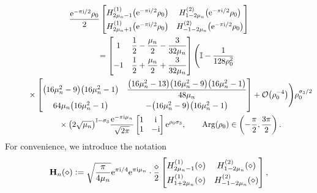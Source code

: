 \documentclass[11pt]{article}
\numberwithin{equation}{section}
\numberwithin{equation}{section}
\newcommand{\ee}{\mathrm{e}}
\newcommand{\ii}{\mathrm{i}}
\renewcommand{\arg}{\operatorname{Arg}}
\begin{document}
\begin{gather}
\dfrac{\ee^{-\pi \ii /2}\rho_0}{2} \begin{bmatrix} H^{(1)}_{2\mu_n-1}\big(\ee^{-\pi \ii/2} \rho_0\big) & H^{(2)}_{1 -2\mu_n}\big(\ee^{-\pi \ii/2} \rho_0\big)\vspace{1mm}\\ H^{(1)}_{2\mu_n + 1}\big(\ee^{-\pi \ii/2} \rho_0\big) & H^{(2)}_{-1-2\mu_n}\big(\ee^{-\pi \ii/2} \rho_0\big)\end{bmatrix} \nonumber\\
\qquad= \begin{bmatrix} 1 & \dfrac{1}{2} - \dfrac{\mu_n}{2} - \dfrac{3}{32\mu_n} \vspace{1mm}\\ -1 & \dfrac{1}{2} + \dfrac{\mu_n}{2} + \dfrac{3}{32\mu_n} \end{bmatrix} \Biggl( \mathbb{I} - \dfrac{1}{128 \rho_0^2}  \nonumber\\
\phantom{\qquad=}{}  \times\begin{bmatrix} \big(16\mu_n^2 - 9\big)\big(16\mu_n^2 - 1\big) & \dfrac{\big(16 \mu_n^2 - 13\big)\big(16\mu_n^2 - 9\big)\big(16\mu_n^2 - 1\big)}{48\mu_n} \vspace{1mm}\\ 64\mu_n\big(16\mu_n^2 - 1\big) & - \big(16\mu_n^2 - 9\big)\big(16\mu_n^2 - 1\big)\end{bmatrix} + \mathcal{O}\big(\rho_0^{-4}\big) \Biggr) \rho_0^{\sigma_3/2}\nonumber\\
\phantom{\qquad=}{} \times \big(2\sqrt{\mu_n}\big)^{\mathbb{I}-\sigma_3}{\dfrac{\ee^{-\pi \ii \mu_n}}{\sqrt{2\pi}}} {}{} \begin{bmatrix} 1 & \ii\\ 1 &-\ii \end{bmatrix} \ee^{ \rho_0 \sigma_3}, \qquad \arg(\rho_0) \in \left( -\dfrac{\pi}{2}, \dfrac{3\pi}{2} \right).
\label{eq:H-expand-zero}
\end{gather}
For convenience, we introduce the notation
\begin{equation}
 \mathbf{H}_n(\diamond) := \sqrt{\dfrac{\pi}{4\mu_n}} \ee^{\pi \ii/4 }\ee^{\pi \ii \mu_n} \cdot \dfrac{\diamond}{2} \begin{bmatrix} H^{(1)}_{2\mu_n - 1}(\diamond) & H^{(2)}_{1 - 2\mu_n }(\diamond) \vspace{1mm}\\ H^{(1)}_{1 + 2\mu_n}(\diamond) & H^{(2)}_{-1-2\mu_n}(\diamond) \end{bmatrix},
 \label{eq:Bn-def}
\end{equation}
\end{document}
